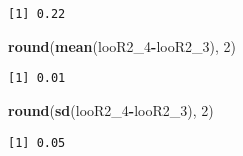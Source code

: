 \documentclass[
]{article}
\newenvironment{Shaded}{\begin{snugshade}}{\end{snugshade}}
\newcommand{\DecValTok}[1]{\textcolor[rgb]{0.00,0.00,0.81}{#1}}
\newcommand{\KeywordTok}[1]{\textcolor[rgb]{0.13,0.29,0.53}{\textbf{#1}}}
\newcommand{\NormalTok}[1]{#1}
\newcommand{\OperatorTok}[1]{\textcolor[rgb]{0.81,0.36,0.00}{\textbf{#1}}}
\begin{document}
\begin{verbatim}
[1] 0.22
\end{verbatim}

\begin{Shaded}
\begin{Highlighting}[]
\KeywordTok{round}\NormalTok{(}\KeywordTok{mean}\NormalTok{(looR2_}\DecValTok{4}\OperatorTok{-}\NormalTok{looR2_}\DecValTok{3}\NormalTok{), }\DecValTok{2}\NormalTok{)}
\end{Highlighting}
\end{Shaded}

\begin{verbatim}
[1] 0.01
\end{verbatim}

\begin{Shaded}
\begin{Highlighting}[]
\KeywordTok{round}\NormalTok{(}\KeywordTok{sd}\NormalTok{(looR2_}\DecValTok{4}\OperatorTok{-}\NormalTok{looR2_}\DecValTok{3}\NormalTok{), }\DecValTok{2}\NormalTok{)}
\end{Highlighting}
\end{Shaded}

\begin{verbatim}
[1] 0.05
\end{verbatim}
\end{document}
